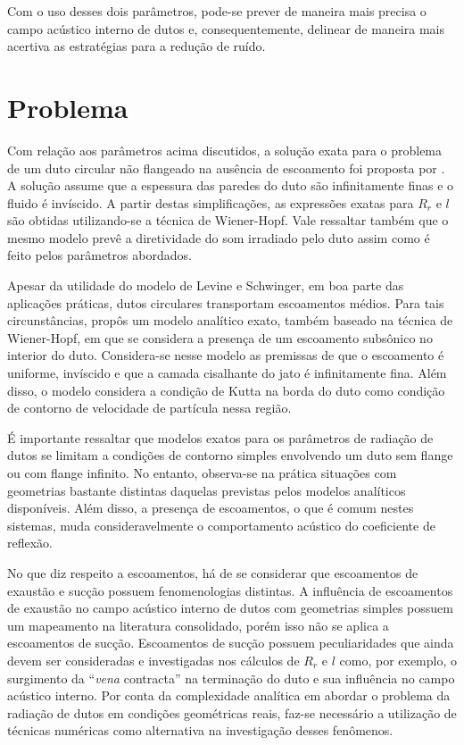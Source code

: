 \newpage
Com o uso desses dois parâmetros, pode-se prever de maneira mais precisa o campo acústico interno de dutos e, consequentemente, delinear de maneira mais acertiva as estratégias para a redução de ruído.

\section{Problema}

Com relação aos parâmetros acima discutidos, a solução exata para o problema de um duto circular não flangeado na ausência de escoamento foi proposta por . A solução assume que a espessura das paredes do duto são infinitamente finas e o fluido é invíscido. A partir destas simplificações, as expressões exatas para $R_{r}$ e $l$ são obtidas utilizando-se a técnica de Wiener-Hopf. Vale ressaltar também que o mesmo modelo prevê a diretividade do som irradiado pelo duto assim como é feito pelos parâmetros abordados.

Apesar da utilidade do modelo de Levine e Schwinger, em boa parte das aplicações práticas, dutos circulares transportam escoamentos médios. Para tais circunstâncias,  propôs um modelo analítico exato, também baseado na técnica de Wiener-Hopf, em que se considera a presença de um escoamento subsônico no interior do duto. Considera-se nesse modelo as premissas de que o escoamento é uniforme, invíscido e que a camada cisalhante do jato é infinitamente fina. Além disso, o modelo considera a condição de Kutta na borda do duto como condição de contorno de velocidade de partícula nessa região.

É importante ressaltar que modelos exatos para os parâmetros de radiação de dutos se limitam a condições de contorno simples envolvendo um duto sem flange ou com flange infinito. No entanto, observa-se na prática situações com geometrias bastante distintas daquelas previstas pelos modelos analíticos disponíveis. Além disso, a presença de escoamentos, o que é comum nestes sistemas, muda consideravelmente o comportamento acústico do coeficiente de reflexão.

No que diz respeito a escoamentos, há de se considerar que escoamentos de exaustão e sucção possuem fenomenologias distintas. A influência de escoamentos de exaustão no campo acústico interno de dutos com geometrias simples possuem um mapeamento na literatura consolidado, porém isso não se aplica a escoamentos de sucção. Escoamentos de sucção possuem peculiaridades que ainda devem ser consideradas e investigadas nos cálculos de $R_{r}$ e $l$ como, por exemplo, o surgimento da ``\textit{vena} contracta'' na terminação do duto e sua influência no campo acústico interno.    
\newpage
Por conta da complexidade analítica em abordar o problema da radiação de dutos em condições geométricas reais, faz-se necessário a utilização de técnicas numéricas como alternativa na investigação desses fenômenos.


